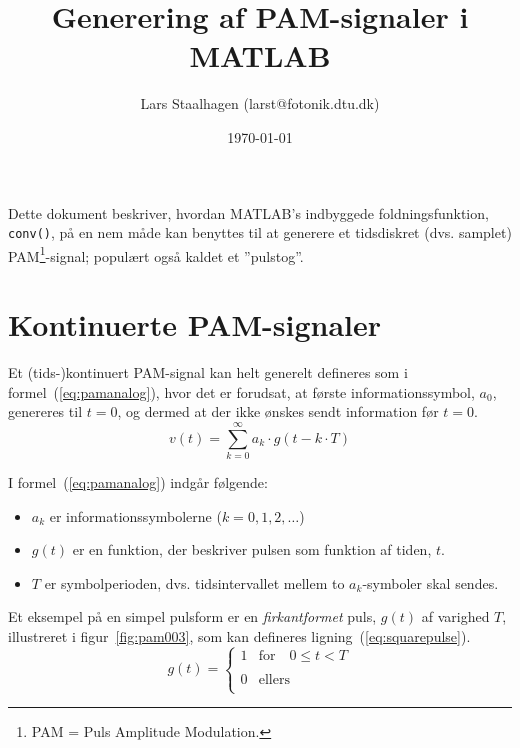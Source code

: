 \documentclass[dvips,11pt,a4paper]{article}
\title{Generering af PAM-signaler i MATLAB}
\author{Lars Staalhagen (larst@fotonik.dtu.dk)}
\date{\today}
\begin{document}
\maketitle

\noindent{}Dette dokument beskriver, hvordan MATLAB's indbyggede foldningsfunktion, \texttt{conv()}, på en nem måde kan benyttes til at generere et tidsdiskret (dvs. samplet) PAM\footnote{PAM =  Puls Amplitude Modulation.}-signal; populært også kaldet et ''pulstog''. 

\section{Kontinuerte PAM-signaler}
Et (tids-)kontinuert PAM-signal kan helt generelt defineres som i formel~(\ref{eq:pamanalog}), hvor det er forudsat, at første informationssymbol, $a_0$, genereres til $t=0$, og dermed at der ikke ønskes sendt information før $t=0$.
\begin{equation}
v(t)=\sum_{k=0}^{\infty} a_{k} \cdot g(t-k \cdot T)
\label{eq:pamanalog}
\end{equation}

\noindent{}I formel~(\ref{eq:pamanalog}) indgår følgende:
\begin{itemize}
\item $a_k$ er informationssymbolerne ($k=0,1,2,\ldots$)
\item $g(t)$ er en funktion, der beskriver pulsen som funktion af tiden, $t$.
\item $T$ er symbolperioden, dvs. tidsintervallet mellem to $a_k$-symboler skal sendes.
\end{itemize}

\noindent{}Et eksempel på en simpel pulsform er en \emph{firkantformet} puls, $g(t)$ af varighed $T$, illustreret i figur~\ref{fig:pam003}, som kan defineres ligning~(\ref{eq:squarepulse}).
\begin{equation}
g(t) = \left\{
	\begin{array}{ll}
	1 & \mathrm{for}\quad{}0 \le t < T \\
	 & \\
	0 & \mathrm{ellers}\\
	\end{array}
	\right.
\label{eq:squarepulse}
\end{equation}
\end{document}
